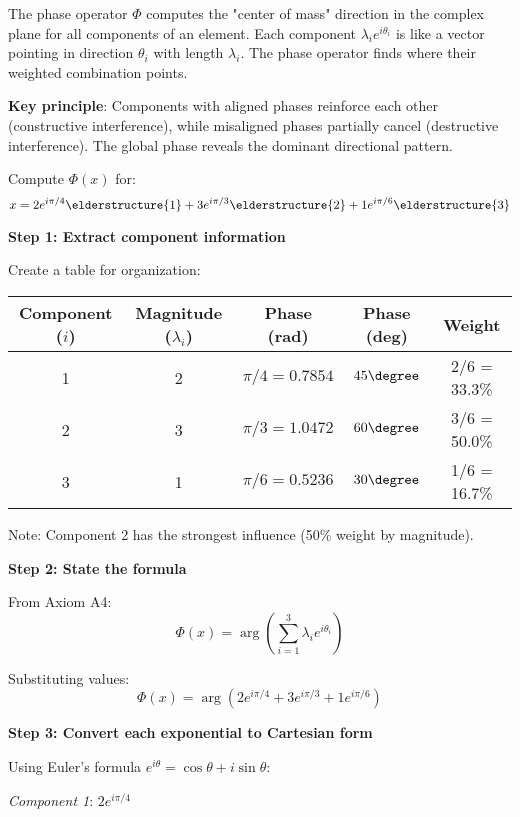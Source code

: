 \begin{intuition}
The phase operator $\Phi$ computes the "center of mass" direction in the complex plane for all components of an element. Each component $\lambda_i e^{i\theta_i}$ is like a vector pointing in direction $\theta_i$ with length $\lambda_i$. The phase operator finds where their weighted combination points.

\textbf{Key principle}: Components with aligned phases reinforce each other (constructive interference), while misaligned phases partially cancel (destructive interference). The global phase reveals the dominant directional pattern.
\end{intuition}

\begin{example}
Compute $\Phi(x)$ for:
$$x = 2e^{i\pi/4} \elderstructure{1} + 3e^{i\pi/3} \elderstructure{2} + 1e^{i\pi/6} \elderstructure{3}$$

\textbf{Step 1: Extract component information}

Create a table for organization:

\begin{center}
\begin{tabular}{|c|c|c|c|c|}
\hline
Component ($i$) & Magnitude ($\lambda_i$) & Phase (rad) & Phase (deg) & Weight \\
\hline
1 & 2 & $\pi/4 = 0.7854$ & $45\degree$ & 2/6 = 33.3\% \\
2 & 3 & $\pi/3 = 1.0472$ & $60\degree$ & 3/6 = 50.0\% \\
3 & 1 & $\pi/6 = 0.5236$ & $30\degree$ & 1/6 = 16.7\% \\
\hline
\end{tabular}
\end{center}

Note: Component 2 has the strongest influence (50\% weight by magnitude).

\textbf{Step 2: State the formula}

From Axiom A4:
$$\Phi(x) = \arg\left(\sum_{i=1}^{3} \lambda_i e^{i\theta_i}\right)$$

Substituting values:
$$\Phi(x) = \arg\left(2e^{i\pi/4} + 3e^{i\pi/3} + 1e^{i\pi/6}\right)$$

\textbf{Step 3: Convert each exponential to Cartesian form}

Using Euler's formula $e^{i\theta} = \cos\theta + i\sin\theta$:

\textit{Component 1}: $2e^{i\pi/4}$


\end{example}
